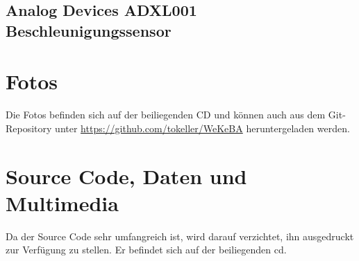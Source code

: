 

\subsection{Analog Devices ADXL001 Beschleunigungssensor}





\section{Fotos}\label{sec.foto.testaufbau}
Die Fotos befinden sich auf der beiliegenden CD und können auch aus dem Git-Repository unter \url{https://github.com/tokeller/WeKeBA} heruntergeladen werden.

\section{Source Code, Daten und Multimedia}\label{app.cd}
Da der Source Code sehr umfangreich ist, wird darauf verzichtet, ihn ausgedruckt zur Verfügung zu stellen. Er befindet sich auf der beiliegenden \gls{cd}.

